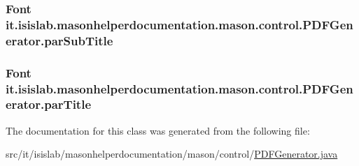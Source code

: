 \hypertarget{classit_1_1isislab_1_1masonhelperdocumentation_1_1mason_1_1control_1_1_p_d_f_generator_ac4f2d6c81c14b60dcddfc358b9296ee5}{
\subsubsection[{par\-Sub\-Title}]{\setlength{\rightskip}{0pt plus 5cm}Font it.\-isislab.\-masonhelperdocumentation.\-mason.\-control.\-P\-D\-F\-Generator.\-par\-Sub\-Title\hspace{0.3cm}{\ttfamily [private]}}}\label{classit_1_1isislab_1_1masonhelperdocumentation_1_1mason_1_1control_1_1_p_d_f_generator_ac4f2d6c81c14b60dcddfc358b9296ee5}
\hypertarget{classit_1_1isislab_1_1masonhelperdocumentation_1_1mason_1_1control_1_1_p_d_f_generator_a74f4e5e2095668aa762c3c3df4325c74}{
\subsubsection[{par\-Title}]{\setlength{\rightskip}{0pt plus 5cm}Font it.\-isislab.\-masonhelperdocumentation.\-mason.\-control.\-P\-D\-F\-Generator.\-par\-Title\hspace{0.3cm}{\ttfamily [private]}}}\label{classit_1_1isislab_1_1masonhelperdocumentation_1_1mason_1_1control_1_1_p_d_f_generator_a74f4e5e2095668aa762c3c3df4325c74}


The documentation for this class was generated from the following file\-:\begin{DoxyCompactItemize}
\item 
src/it/isislab/masonhelperdocumentation/mason/control/\hyperlink{_p_d_f_generator_8java}{P\-D\-F\-Generator.\-java}\end{DoxyCompactItemize}
